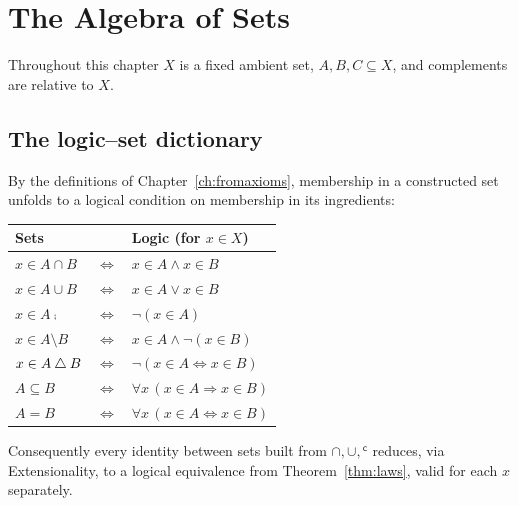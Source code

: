 \chapter{The Algebra of Sets}\label{ch:algebra}

Throughout this chapter $X$ is a fixed ambient set, $A,B,C\subseteq X$, and complements are relative to $X$.

\section{The logic--set dictionary}

By the definitions of Chapter~\ref{ch:fromaxioms}, membership in a constructed set unfolds to a logical condition on membership in its ingredients:
\begin{center}
	\begin{tabular}{@{}lcl@{}}
		\toprule
		\textbf{Sets} & & \textbf{Logic (for $x\in X$)}\\
		\midrule
		$x\in A\cap B$ & $\iff$ & $x\in A\wedge x\in B$\\
		$x\in A\cup B$ & $\iff$ & $x\in A\vee x\in B$\\
		$x\in A\comp$ & $\iff$ & $\neg(x\in A)$\\
		$x\in A\setminus B$ & $\iff$ & $x\in A\wedge\neg(x\in B)$\\
		$x\in A\mathbin{\triangle} B$ & $\iff$ & $\neg(x\in A\Leftrightarrow x\in B)$\\
		$A\subseteq B$ & $\iff$ & $\forall x\,(x\in A\Rightarrow x\in B)$\\
		$A=B$ & $\iff$ & $\forall x\,(x\in A\Leftrightarrow x\in B)$\\
		\bottomrule
	\end{tabular}
\end{center}
Consequently every identity between sets built from $\cap,\cup,{}^{\mathsf c}$ reduces, via Extensionality, to a logical equivalence from Theorem~\ref{thm:laws}, valid for each $x$ separately.

